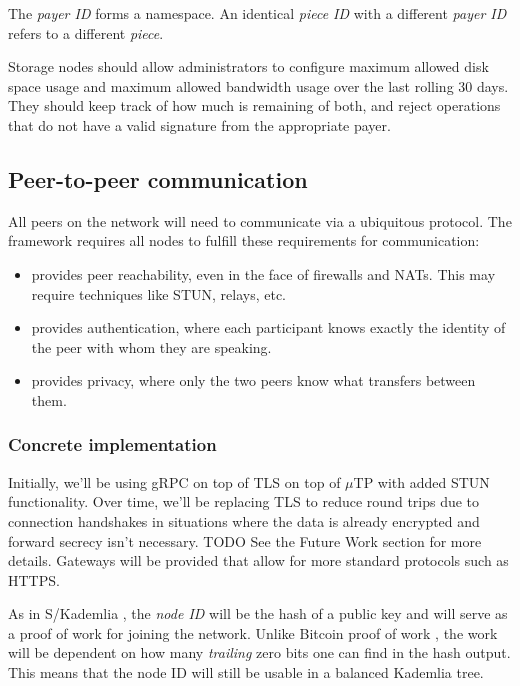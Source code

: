 \documentclass[a4paper,10pt]{article} \usepackage[utf8]{inputenc}
\newcommand{\todo}[1]{{\color{red} TODO #1 }}
\begin{document}
The {\em payer ID} forms a namespace. An identical {\em piece ID} with a
different {\em payer ID} refers to a different {\em piece}.

Storage nodes should allow administrators to configure maximum allowed disk
space usage and maximum allowed bandwidth usage over the last rolling 30 days. They should keep track of how much is remaining of both, and reject operations that do not have a valid signature
 from the appropriate payer.

\subsection{Peer-to-peer communication}

All peers on the network will need to communicate via a ubiquitous protocol. The framework requires all 
nodes to fulfill these requirements for communication: 

\begin{itemize}
\item provides peer reachability, even in the face of firewalls
and NATs. This may require techniques like STUN, relays, etc.
\item provides authentication, where each participant knows
exactly the identity of the peer with whom they are speaking.
\item provides privacy, where only the two peers
know what transfers between them.
\end{itemize}

\subsubsection{Concrete implementation}

Initially, we'll be using gRPC \cite{grpc} on top of TLS on top of $\mu$TP
\cite{utp} with added STUN functionality. Over time, we'll be replacing TLS to
reduce round trips due to connection handshakes in situations where the data is
already encrypted and forward secrecy isn't necessary. \todo{} See the Future
Work section for more details. Gateways will be provided that allow for more
standard protocols such as HTTPS.

As in S/Kademlia \cite{skad}, the {\em node ID} will be the hash of a public key
and will serve as a proof of work for joining the network. Unlike Bitcoin proof
of work \cite{bitcoin}, the work will be dependent on how many {\em trailing}
zero bits one can find in the hash output. This means that the node ID will
still be usable in a balanced Kademlia \cite{kad} tree.
\end{document}
